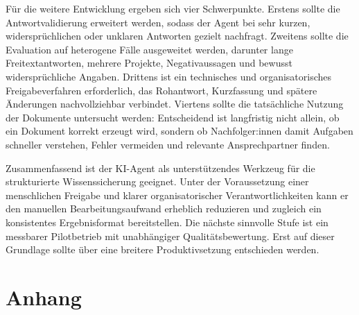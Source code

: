 \documentclass[
  10pt,
  ngerman,
  a4paper,
  toc=graduated,
  numbers=noenddot,
  headings=standardclasses,
  nonumberlist
]{scrartcl}
\begin{document}
Für die weitere Entwicklung ergeben sich vier Schwerpunkte. Erstens sollte die Antwortvalidierung erweitert werden, sodass der Agent bei sehr kurzen, widersprüchlichen oder unklaren Antworten gezielt nachfragt. Zweitens sollte die Evaluation auf heterogene Fälle ausgeweitet werden, darunter lange Freitextantworten, mehrere Projekte, Negativaussagen und bewusst widersprüchliche Angaben. Drittens ist ein technisches und organisatorisches Freigabeverfahren erforderlich, das Rohantwort, Kurzfassung und spätere Änderungen nachvollziehbar verbindet. Viertens sollte die tatsächliche Nutzung der Dokumente untersucht werden: Entscheidend ist langfristig nicht allein, ob ein Dokument korrekt erzeugt wird, sondern ob Nachfolger:innen damit Aufgaben schneller verstehen, Fehler vermeiden und relevante Ansprechpartner finden.

Zusammenfassend ist der KI-Agent als unterstützendes Werkzeug für die strukturierte Wissenssicherung geeignet. Unter der Voraussetzung einer menschlichen Freigabe und klarer organisatorischer Verantwortlichkeiten kann er den manuellen Bearbeitungsaufwand erheblich reduzieren und zugleich ein konsistentes Ergebnisformat bereitstellen. Die nächste sinnvolle Stufe ist ein messbarer Pilotbetrieb mit unabhängiger Qualitätsbewertung. Erst auf dieser Grundlage sollte über eine breitere Produktivsetzung entschieden werden.



\newpage
{}

\begingroup
\raggedright


\endgroup




\newpage
\appendix

\setcounter{page}{1}

\section*{Anhang}
\end{document}
